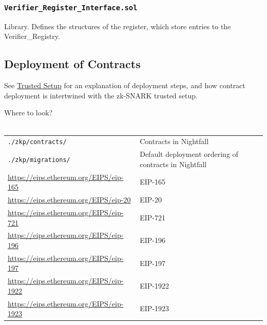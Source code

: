 \subsubsection{\texttt{Verifier\_Register\_Interface.sol}}
Library. Defines the structures of the register, which store entries to the Verifier\_Registry.

\subsection{Deployment of Contracts}
\label{sec:deploymentOfContracts}
See \hyperref[fig:trustedSetup]{Trusted Setup} for an explanation of deployment steps, and how contract deployment is intertwined with the zk-SNARK trusted setup.

\begin{center}
	\begin{mdframed}[backgroundcolor=verylightblue]
		Where to look?\\
		\\
		\begin{tabular}{lp{14cm}}
			\texttt{./zkp/contracts/} & Contracts in Nightfall\\
			\texttt{./zkp/migrations/} & Default deployment ordering of contracts in Nightfall\\
			\url{https://eips.ethereum.org/EIPS/eip-165} & EIP-165\\
			\url{https://eips.ethereum.org/EIPS/eip-20} & EIP-20\\
			\url{https://eips.ethereum.org/EIPS/eip-721} & EIP-721\\
			\url{https://eips.ethereum.org/EIPS/eip-196} & EIP-196\\
			\url{https://eips.ethereum.org/EIPS/eip-197} & EIP-197\\
			\url{https://eips.ethereum.org/EIPS/eip-1922} & EIP-1922\\
			\url{https://eips.ethereum.org/EIPS/eip-1923} & EIP-1923
		\end{tabular}
	\end{mdframed}
\end{center}




